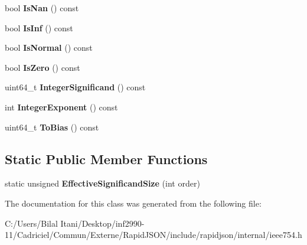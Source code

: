 \begin{DoxyCompactItemize}
\item 
bool {\bfseries Is\+Nan} () const \hypertarget{classinternal_1_1_double_a5c1ad93b8c866afdd5c2b412ef7bea98}{}\label{classinternal_1_1_double_a5c1ad93b8c866afdd5c2b412ef7bea98}

\item 
bool {\bfseries Is\+Inf} () const \hypertarget{classinternal_1_1_double_a2efab47ffbfa75e0fca1129263b86545}{}\label{classinternal_1_1_double_a2efab47ffbfa75e0fca1129263b86545}

\item 
bool {\bfseries Is\+Normal} () const \hypertarget{classinternal_1_1_double_ac34b7871eeb80d2b6bac48f144c97b51}{}\label{classinternal_1_1_double_ac34b7871eeb80d2b6bac48f144c97b51}

\item 
bool {\bfseries Is\+Zero} () const \hypertarget{classinternal_1_1_double_a6eb58f2690af582efeb9b76ef35c4c60}{}\label{classinternal_1_1_double_a6eb58f2690af582efeb9b76ef35c4c60}

\item 
uint64\+\_\+t {\bfseries Integer\+Significand} () const \hypertarget{classinternal_1_1_double_a96c5e0f06551e83565b5097950d30e32}{}\label{classinternal_1_1_double_a96c5e0f06551e83565b5097950d30e32}

\item 
int {\bfseries Integer\+Exponent} () const \hypertarget{classinternal_1_1_double_a8e16ee31d521fb56f0b98be427a9d47e}{}\label{classinternal_1_1_double_a8e16ee31d521fb56f0b98be427a9d47e}

\item 
uint64\+\_\+t {\bfseries To\+Bias} () const \hypertarget{classinternal_1_1_double_af8b543dc813f761d274824f7cef00a43}{}\label{classinternal_1_1_double_af8b543dc813f761d274824f7cef00a43}

\end{DoxyCompactItemize}
\subsection*{Static Public Member Functions}
\begin{DoxyCompactItemize}
\item 
static unsigned {\bfseries Effective\+Significand\+Size} (int order)\hypertarget{classinternal_1_1_double_a980c26d006068b23406805e9b0e02588}{}\label{classinternal_1_1_double_a980c26d006068b23406805e9b0e02588}

\end{DoxyCompactItemize}


The documentation for this class was generated from the following file\+:\begin{DoxyCompactItemize}
\item 
C\+:/\+Users/\+Bilal Itani/\+Desktop/inf2990-\/11/\+Cadriciel/\+Commun/\+Externe/\+Rapid\+J\+S\+O\+N/include/rapidjson/internal/ieee754.\+h\end{DoxyCompactItemize}
